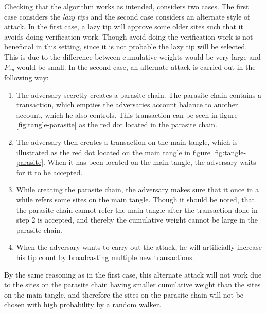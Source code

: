 Checking that the algorithm works as intended, \cite{tangle} considers two cases. The first case considers the \emph{lazy tips} and the second case considers an alternate style of attack. In the first case, a lazy tip will approve some older sites such that it avoids doing verification work. Though avoid doing the verification work is not beneficial in this setting, since it is not probable the lazy tip will be selected. This is due to the difference between cumulative weights would be very large and $P_{xy}$ would be small. In the second case, an alternate attack is carried out in the following way:
\begin{enumerate}
    \item The adversary secretly creates a parasite chain. The parasite chain contains a transaction, which empties the adversaries account balance to another account, which he also controls. This transaction can be seen in figure \ref{fig:tangle-parasite} as the red dot located in the parasite chain. 
    \item The adversary then creates a transaction on the main tangle, which is illustrated as the red dot located on the main tangle in figure \ref{fig:tangle-parasite}. When it has been located on the main tangle, the adversary waits for it to be accepted. 
    \item While creating the parasite chain, the adversary makes sure that it once in a while refers some sites on the main tangle. Though it should be noted, that the parasite chain cannot refer the main tangle after the transaction done in step 2 is accepted, and thereby the cumulative weight cannot be large in the parasite chain.
    \item When the adversary wants to carry out the attack, he will artificially increase his tip count by broadcasting multiple new transactions.
\end{enumerate}
By the same reasoning as in the first case, this alternate attack will not work due to the sites on the parasite chain having smaller cumulative weight than the sites on the main tangle, and therefore the sites on the parasite chain will not be chosen with high probability by a random walker.  \\

